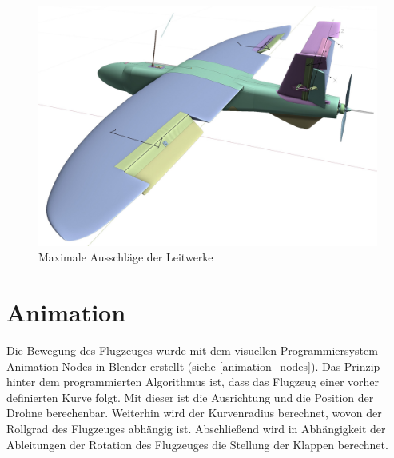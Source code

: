 \begin{figure}[H]
\begin{center}
\includegraphics[width=\textwidth]{gfx/prod/plane/plane8.jpg}
\caption{Maximale Ausschläge der Leitwerke}
\label{rigged_plane}
\end{center}
\end{figure}
%
\section{Animation}

Die Bewegung des Flugzeuges wurde mit dem visuellen Programmiersystem Animation Nodes in Blender erstellt (siehe \autoref{animation_nodes}). Das Prinzip hinter dem programmierten Algorithmus ist, dass das Flugzeug einer vorher definierten Kurve folgt. Mit dieser ist die Ausrichtung und die Position der Drohne berechenbar. Weiterhin wird der Kurvenradius berechnet, wovon der Rollgrad des Flugzeuges abhängig ist. Abschließend wird in Abhängigkeit der Ableitungen der Rotation des Flugzeuges die Stellung der Klappen berechnet.

